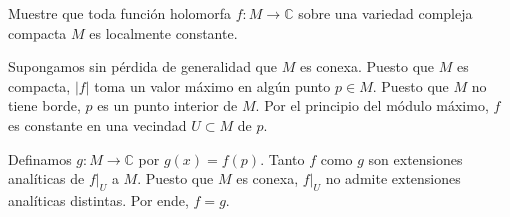 \begin{problem}
Muestre que toda función holomorfa $f : M \to \mathbb C$ sobre una variedad compleja compacta $M$ es localmente constante.
\end{problem}

\begin{solution}
Supongamos sin pérdida de generalidad que $M$ es conexa. Puesto que $M$ es compacta, $|f|$ toma un valor máximo en algún punto $p \in M$. Puesto que $M$ no tiene borde, $p$ es un punto interior de $M$. Por el principio del módulo máximo, $f$ es constante en una vecindad $U \subset M$ de $p$.

Definamos $g : M \to \mathbb C$ por $g(x) = f(p)$. Tanto $f$ como $g$ son extensiones analíticas de $f|_U$ a $M$. Puesto que $M$ es conexa, $f|_U$ no admite extensiones analíticas distintas. Por ende, $f = g$.
\end{solution}
